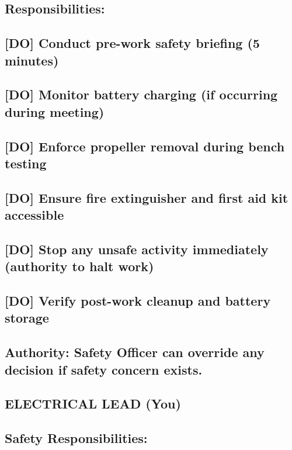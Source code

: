 \documentclass[11pt,letterpaper]{article}
\begin{document}
{{\subsection*{Responsibilities:}

\subsection*{[DO] Conduct pre-work safety briefing (5 minutes)}

\subsection*{[DO] Monitor battery charging (if occurring during meeting)}

\subsection*{[DO] Enforce propeller removal during bench testing}

\subsection*{[DO] Ensure fire extinguisher and first aid kit accessible}

\subsection*{[DO] Stop any unsafe activity immediately (authority to halt work)}

\subsection*{[DO] Verify post-work cleanup and battery storage}

\subsection*{Authority: Safety Officer can override any decision if safety concern exists.}

\subsection*{ELECTRICAL LEAD (You)}

\subsection*{Safety Responsibilities:}

}}
\end{document}
